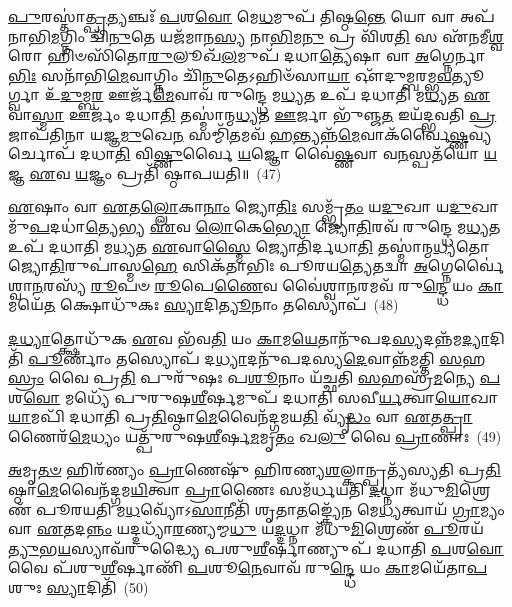 \-\ul{𑌪𑍁}\-𑌰𑌸𑍍𑌤𑌾॑\-\ul{𑌤𑍍𑌪𑍍𑌰}\-𑌤𑍍𑌯𑌞𑍍𑌚𑌃᳴ \ul{𑌪}\-𑌶\-\ul{𑌵𑍋} 𑌮𑍇\-\ul{𑌧}\-𑌮𑍁𑌪᳴ 𑌤𑌿𑌷𑍍𑌠\-\ul{𑌨𑍍𑌤𑍇} 𑌯𑍋 𑌵𑌾 𑌅𑌪᳴𑌨𑌾𑌭𑌿\-\ul{𑌮}\-𑌗𑍍𑌨𑌿𑌂 𑌚𑌿᳴\-\ul{𑌨𑍁}\-𑌤𑍇 𑌯𑌜᳴𑌮𑌾𑌨\-\ul{𑌸𑍍𑌯} 𑌨𑌾\-\ul{𑌭𑌿}\-𑌮\-\ul{𑌨𑍁} 𑌪𑍍𑌰 𑌵𑌿᳴𑌶\-\ul{𑌤𑌿} 𑌸 𑌏᳴𑌨𑌮𑍀\-\ul{𑌶𑍍𑌵}\-𑌰𑍋 𑌹𑌿𑍞𑌸𑌿᳴𑌤𑍋\-\ul{𑌰𑍁}\-𑌲𑍂𑌖᳴\-\ul{𑌲}\-𑌮𑍁𑌪᳴ 𑌦𑌧𑌾\-\ul{𑌤𑍍𑌯𑍇}\-𑌷𑌾 𑌵𑌾 \ul{𑌅}\-𑌗𑍍𑌨𑍇𑌰𑍍𑌨𑌾\-\ul{𑌭𑌿𑌃} 𑌸𑌨𑌾᳴𑌭𑌿\-\ul{𑌮𑍇}\-𑌵𑌾𑌗𑍍𑌨𑌿𑌂 𑌚𑌿᳴\-\ul{𑌨𑍁}\-𑌤𑍇\-𑌽𑌹𑌿𑍞᳴𑌸𑌾\-\ul{𑌯𑌾} 𑌔᳴𑌦𑍁𑌮𑍍𑌬𑌰𑌮𑍍𑌭\-\ul{𑌵}\-𑌤𑍍𑌯𑍂𑌰𑍍𑌗𑍍𑌵𑌾 𑌉᳴\-\ul{𑌦𑍁}\-𑌮𑍍𑌬\-\ul{𑌰} 𑌊𑌰𑍍𑌜᳴\-\ul{𑌮𑍇}\-𑌵𑌾𑌵᳴ 𑌰𑍁𑌨𑍍𑌦𑍍𑌧𑍇 𑌮\-\ul{𑌧𑍍𑌯}\-𑌤 𑌉𑌪᳴ 𑌦𑌧𑌾𑌤𑌿 𑌮\-\ul{𑌧𑍍𑌯}\-𑌤 \ul{𑌏}\-𑌵𑌾\-\ul{𑌸𑍍𑌮𑌾} 𑌊𑌰𑍍𑌜𑌂᳴ 𑌦𑌧𑌾\-\ul{𑌤𑌿} 𑌤𑌸𑍍𑌮𑌾॑𑌨𑍍𑌮\-\ul{𑌧𑍍𑌯}\-𑌤 \ul{𑌊}\-𑌰𑍍𑌜𑌾 𑌭𑍁᳴𑌞𑍍𑌜\-\ul{𑌤} 𑌇𑌯᳴𑌦𑍍𑌭𑌵𑌤𑌿 \ul{𑌪𑍍𑌰}\-𑌜𑌾𑌪᳴𑌤𑌿𑌨𑌾 𑌯𑌜𑍍𑌞\-\ul{𑌮𑍁}\-𑌖𑍇\-\ul{𑌨} 𑌸𑌮𑍍𑌮𑌿᳴\-\ul{𑌤}\-𑌮𑌵᳴ \ul{𑌹}\-𑌨𑍍𑌤𑍍𑌯𑌨𑍍𑌨᳴\-\ul{𑌮𑍇}\-𑌵𑌾𑌕᳴𑌰𑍍𑌵𑍈\-\ul{𑌷𑍍𑌣}\-𑌵𑍍𑌯𑌰𑍍𑌚𑍋𑌪᳴ 𑌦𑌧𑌾\-\ul{𑌤𑌿} 𑌵𑌿\-\ul{𑌷𑍍𑌣𑍁}\-𑌰𑍍𑌵𑍈 \ul{𑌯}\-𑌜𑍍𑌞𑍋 𑌵𑍈॑\-\ul{𑌷𑍍𑌣}\-𑌵𑌾 𑌵\-\ul{𑌨}\-𑌸𑍍𑌪𑌤᳴𑌯𑍋 \ul{𑌯}\-𑌜𑍍𑌞 \ul{𑌏}\-𑌵 \ul{𑌯}\-𑌜𑍍𑌞𑌂 𑌪𑍍𑌰𑌤𑌿᳴ 𑌷𑍍𑌠𑌾𑌪𑌯𑌤𑌿॥~(47)

{\anuvakamend[{\-\ul{𑌏}\-𑌷 𑌵𑍈 \ul{𑌪}\-𑌶𑍁𑌰𑍍𑌯𑌮᳴𑌸𑌰𑍍𑌪\-\ul{𑌦𑍇}\-𑌷 𑌯𑌤𑍍𑌤\-\ul{𑌸𑍍𑌮𑌾}\-𑌤𑍍𑌤𑌸𑍍𑌮𑌾॑\-\ul{𑌥𑍍𑌸}\-𑌪𑍍𑌤𑌵𑌿𑍞᳴𑌶𑌤𑌿𑌶𑍍𑌚}]}%

\-\ul{𑌏}\-𑌷𑌾𑌂 𑌵𑌾 \ul{𑌏}\-𑌤\-\ul{𑌲𑍍𑌲𑍋}\-𑌕𑌾\-\ul{𑌨𑌾𑌂} 𑌜𑍍𑌯𑍋\-\ul{𑌤𑌿𑌃} 𑌸𑌮𑍍𑌭𑍃᳴\-\ul{𑌤𑌂} 𑌯\-\ul{𑌦𑍁}\-𑌖𑌾 𑌯\-\ul{𑌦𑍁}\-𑌖𑌾𑌮𑍁᳴\-\ul{𑌪}\-𑌦𑌧𑌾॑\-\ul{𑌤𑍍𑌯𑍇}\-𑌭𑍍𑌯 \ul{𑌏}\-𑌵 \ul{𑌲𑍋}\-𑌕𑍇\-\ul{𑌭𑍍𑌯𑍋} 𑌜𑍍𑌯𑍋\-\ul{𑌤𑌿}\-𑌰𑌵᳴ 𑌰𑍁𑌨𑍍𑌦𑍍𑌧𑍇 𑌮\-\ul{𑌧𑍍𑌯}\-𑌤 𑌉𑌪᳴ 𑌦𑌧𑌾𑌤𑌿 𑌮\-\ul{𑌧𑍍𑌯}\-𑌤 \ul{𑌏}\-𑌵𑌾\-\ul{𑌸𑍍𑌮𑍈} 𑌜𑍍𑌯𑍋𑌤𑌿᳴𑌰𑍍𑌦𑌧𑌾\-\ul{𑌤𑌿} 𑌤𑌸𑍍𑌮𑌾॑𑌨𑍍𑌮\-\ul{𑌧𑍍𑌯}\-𑌤𑍋 𑌜𑍍𑌯𑍋\-\ul{𑌤𑌿}\-𑌰𑍁𑌪𑌾॑𑌸𑍍𑌮\-\ul{𑌹𑍇} 𑌸𑌿𑌕᳴𑌤𑌾𑌭𑌿𑌃 𑌪𑍂𑌰𑌯\-\ul{𑌤𑍍𑌯𑍇}\-𑌤𑌦𑍍𑌵𑌾 \ul{𑌅}\-𑌗𑍍𑌨𑍇𑌰𑍍𑌵𑍈॑𑌶𑍍𑌵𑌾\-\ul{𑌨}\-𑌰𑌸𑍍𑌯᳴ \ul{𑌰𑍂}\-𑌪𑍞 \ul{𑌰𑍂}\-𑌪𑍇\-\ul{𑌣𑍈}\-𑌵 𑌵𑍈॑𑌶𑍍𑌵𑌾\-\ul{𑌨}\-𑌰𑌮𑌵᳴ 𑌰𑍁\-\ul{𑌨𑍍𑌦𑍍𑌧𑍇} 𑌯𑌂 \ul{𑌕𑌾}\-𑌮𑌯𑍇᳴\-\ul{𑌤} 𑌕𑍍𑌷𑍋𑌧𑍁᳴𑌕𑌃 \ul{𑌸𑍍𑌯𑌾}\-𑌦𑌿\-\ul{𑌤𑍍𑌯𑍂}\-𑌨𑌾𑌂 𑌤𑌸𑍍𑌯𑍋𑌪᳴~(48)

\-\ul{𑌦}\-\-\ul{𑌧𑍍𑌯𑌾}\-𑌤𑍍𑌕𑍍𑌷𑍋𑌧𑍁᳴𑌕 \ul{𑌏}\-𑌵 𑌭᳴𑌵\-\ul{𑌤𑌿} 𑌯𑌂 \ul{𑌕𑌾}\-𑌮\-\ul{𑌯𑍇}\-𑌤𑌾𑌨𑍁᳴𑌪𑌦\-\ul{𑌸𑍍𑌯}\-𑌦𑌨𑍍𑌨᳴𑌮\-\ul{𑌦𑍍𑌯𑌾}\-𑌦𑌿𑌤𑌿᳴ \ul{𑌪𑍂}\-𑌰𑍍𑌣𑌾𑌂 𑌤𑌸𑍍𑌯𑍋𑌪᳴ 𑌦\-\ul{𑌧𑍍𑌯𑌾}\-𑌦𑌨𑍁᳴𑌪𑌦𑌸𑍍𑌯\-\ul{𑌦𑍇}\-𑌵𑌾𑌨𑍍𑌨᳴𑌮𑌤𑍍𑌤𑌿 \ul{𑌸}\-𑌹\-\ul{𑌸𑍍𑌰𑌂} 𑌵𑍈 𑌪𑍍𑌰\-\ul{𑌤𑌿} 𑌪𑍁𑌰𑍁᳴𑌷𑌃 𑌪\-\ul{𑌶𑍂}\-𑌨𑌾𑌂 𑌯᳴𑌚𑍍𑌛𑌤𑌿 \ul{𑌸}\-𑌹𑌸𑍍𑌰᳴\-\ul{𑌮}\-𑌨𑍍𑌯𑍇 \ul{𑌪}\-𑌶\-\ul{𑌵𑍋} 𑌮𑌧𑍍𑌯𑍇᳴ 𑌪𑍁𑌰𑍁𑌷\-\ul{𑌶𑍀}\-𑌰𑍍\mbox{}𑌷𑌮𑍁𑌪᳴ 𑌦𑌧𑌾𑌤𑌿 𑌸𑌵𑍀\-\ul{𑌰𑍍𑌯}\-𑌤𑍍𑌵𑌾\-\ul{𑌯𑍋}\-𑌖𑌾\-\ul{𑌯𑌾}\-𑌮𑌪𑌿᳴ 𑌦𑌧𑌾𑌤𑌿 𑌪𑍍𑌰\-\ul{𑌤𑌿}\-𑌷𑍍𑌠𑌾\-\ul{𑌮𑍇}\-𑌵𑍈𑌨᳴𑌦𑍍𑌗𑌮𑌯\-\ul{𑌤𑌿} 𑌵𑍍𑌯𑍃᳴\-\ul{𑌦𑍍𑌧𑌂} 𑌵𑌾 \ul{𑌏}\-𑌤\-\ul{𑌤𑍍𑌪𑍍𑌰𑌾}\-𑌣𑍈𑌰᳴\-\ul{𑌮𑍇}\-𑌧𑍍𑌯𑌂 𑌯𑌤𑍍𑌪𑍁᳴𑌰𑍁𑌷\-\ul{𑌶𑍀}\-𑌰𑍍\mbox{}𑌷\-\ul{𑌮}\-𑌮𑍃\-\ul{𑌤𑌂} 𑌖\-\ul{𑌲𑍁} 𑌵𑍈 \ul{𑌪𑍍𑌰𑌾}\-𑌣𑌾𑌃~(49)

\-\ul{𑌅}\-𑌮𑍃\-\ul{𑌤}\-\-\ul{𑍞} 𑌹𑌿𑌰᳴𑌣𑍍𑌯𑌂 \ul{𑌪𑍍𑌰𑌾}\-𑌣𑍇𑌷𑍁᳴ 𑌹𑌿𑌰𑌣𑍍𑌯\-\ul{𑌶}\-𑌲𑍍𑌕𑌾𑌨𑍍𑌪𑍍𑌰𑌤𑍍𑌯᳴𑌸𑍍𑌯𑌤𑌿 𑌪𑍍𑌰\-\ul{𑌤𑌿}\-𑌷𑍍𑌠𑌾\-\ul{𑌮𑍇}\-𑌵𑍈𑌨᳴𑌦𑍍𑌗𑌮\-\ul{𑌯𑌿}\-𑌤𑍍𑌵𑌾 \ul{𑌪𑍍𑌰𑌾}\-𑌣𑍈𑌃 𑌸𑌮᳴𑌰𑍍𑌧𑌯𑌤𑌿 \ul{𑌦}\-𑌧𑍍𑌨𑌾 𑌮᳴𑌧𑍁\-\ul{𑌮𑌿}\-𑌶𑍍𑌰𑍇𑌣᳴ 𑌪𑍂𑌰𑌯𑌤𑌿 𑌮\-\ul{𑌧}\-𑌵𑍍𑌯𑍋᳴\-𑌽\-\ul{𑌸𑌾}\-𑌨𑍀𑌤𑌿᳴ 𑌶𑍃𑌤𑌾\-\ul{𑌤}\-𑌙𑍍𑌕𑍍𑌯𑍇᳴𑌨 𑌮𑍇\-\ul{𑌧𑍍𑌯}\-𑌤𑍍𑌵𑌾𑌯᳴ \ul{𑌗𑍍𑌰𑌾}\-𑌮𑍍𑌯𑌂 𑌵𑌾 \ul{𑌏}\-𑌤𑌦\-\ul{𑌨𑍍𑌨𑌂} 𑌯𑌦𑍍𑌦𑌧𑍍𑌯𑌾᳴\-\ul{𑌰}\-𑌣𑍍𑌯𑌮𑍍𑌮\-\ul{𑌧𑍁} 𑌯\-\ul{𑌦𑍍𑌦}\-𑌧𑍍𑌨𑌾 𑌮᳴𑌧𑍁\-\ul{𑌮𑌿}\-𑌶𑍍𑌰𑍇𑌣᳴ \ul{𑌪𑍂}\-𑌰𑌯᳴\-\ul{𑌤𑍍𑌯𑍁}\-𑌭\-\ul{𑌯}\-𑌸𑍍𑌯𑌾𑌵᳴𑌰𑍁𑌦𑍍𑌧𑍍𑌯𑍈 𑌪𑌶𑍁\-\ul{𑌶𑍀}\-𑌰𑍍\mbox{}𑌷𑌾𑌣𑍍𑌯𑍁𑌪᳴ 𑌦𑌧𑌾𑌤𑌿 \ul{𑌪}\-𑌶\-\ul{𑌵𑍋} 𑌵𑍈 𑌪᳴𑌶𑍁\-\ul{𑌶𑍀}\-𑌰𑍍\mbox{}𑌷𑌾𑌣𑌿᳴ \ul{𑌪}\-𑌶𑍂\-\ul{𑌨𑍇}\-𑌵𑌾𑌵᳴ 𑌰𑍁\-\ul{𑌨𑍍𑌦𑍍𑌧𑍇} 𑌯𑌂 \ul{𑌕𑌾}\-𑌮𑌯𑍇᳴𑌤𑌾\-\ul{𑌪}\-𑌶𑍁𑌃 \ul{𑌸𑍍𑌯𑌾}\-𑌦𑌿𑌤𑌿᳴~(50)

